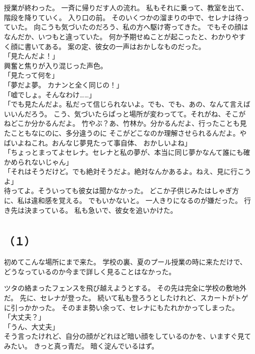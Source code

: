 \documentclass[../IHMain]{subfiles}
\begin{document}
\section{}
授業が終わった。
一斉に帰りだす人の流れ。
私もそれに乗って、教室を出て、階段を降りていく。
入り口の前。
そのいくつかの溜まりの中で、セレナは待っていた。
向こうも気づいたのだろう、私の方へ駆け寄ってきた。
でもその顔はなんだか、いつもと違っていた。
何か予期せぬことが起こったと、わかりやすく顔に書いてある。
案の定、彼女の一声はおかしなものだった。\\
「見たんだよ！」\\
興奮と焦りが入り混じった声色。\\
「見たって何を」\\
「夢だよ夢。
カナンと全く同じの！」\\
「嘘でしょ。そんなわけ……」\\
「でも見たんだよ。私だって信じられないよ。でも、でも、あの、なんて言えばいいんだろう。
こう、気づいたらぱっと場所が変わってて。それがね、そこがねどこか分かるんだよ。
竹やぶ？あ、竹林か。分かるんだよ、行ったことも見たこともなにのに、多分違うのに
そこがどこなのか理解させられるんだよ。やばいよねこれ。おんなじ夢見たって事自体、
おかしいよね」\\
「ちょっとまってよセレナ。セレナと私の夢が、本当に同じ夢かなんて誰にも確かめられないじゃん」\\
「それはそうだけど。でも絶対そうだよ。絶対なんかあるよ。ねえ、見に行こうよ」\\
待ってよ。そういっても彼女は聞かなかった。
どこか子供じみたはしゃぎ方に、私は違和感を覚える。
でもいかないと。
一人きりになるのが嫌だった。
行き先は決まっている。
私も急いで、彼女を追いかけた。
\section{}
\subsection*{（１）}
初めてこんな場所にまで来た。
学校の裏、夏のプール授業の時に来ただけで、どうなっているのか今まで詳しく見ることはなかった。

ツタの絡まったフェンスを飛び越えようとする。
その先は完全に学校の敷地外だ。
先に、セレナが登った。
続いて私も登ろうとしたけれど、スカートがトゲに引っかかった。
そのまま勢い余って、セレナにもたれかかってしまった。
「大丈夫？」\\
「うん、大丈夫」\\
そう言ったけれど、自分の顔がどれほど暗い顔をしているのかを、いますぐ見てみたい。
きっと真っ青だ。
暗く淀んでいるはず。
\end{document}
